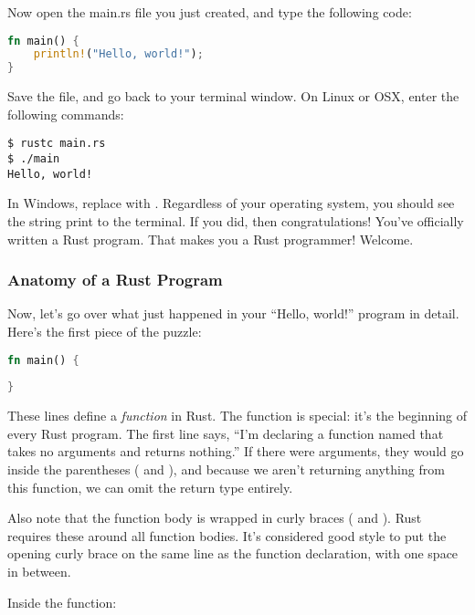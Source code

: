 \blank

Now open the main.rs file you just created, and type the following code:

\begin{lstlisting}[language=Rust]
fn main() {
    println!("Hello, world!");
}
\end{lstlisting}

Save the file, and go back to your terminal window. On Linux or OSX, enter the following commands:

\begin{verbatim}
$ rustc main.rs
$ ./main
Hello, world!
\end{verbatim}

In Windows, replace  with . Regardless of your operating system, you should see the string 
 print to the terminal. If you did, then congratulations! You've officially written a Rust program. 
That makes you a Rust programmer! Welcome.

\subsubsection*{Anatomy of a Rust Program}

Now, let’s go over what just happened in your \enquote{Hello, world!} program in detail. Here's the first piece of the puzzle:

\begin{lstlisting}[language=Rust]
fn main() {
    
}
\end{lstlisting}

These lines define a \emph{function} in Rust. The  function is special: it's the beginning of every Rust program. The 
first line says, \enquote{I’m declaring a function named  that takes no arguments and returns nothing.} If there were 
arguments, they would go inside the parentheses (\code{(} and \code{)}), and because we aren’t returning anything from this function, 
we can omit the return type entirely.

\blank

Also note that the function body is wrapped in curly braces (\code{\{} and \code{\}}). Rust requires these around all function
bodies. It's considered good style to put the opening curly brace on the same line as the function declaration, with one space 
in between.

\blank

Inside the  function:

